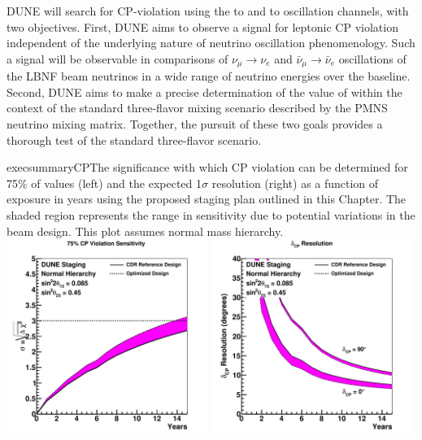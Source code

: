 DUNE will search for CP-violation using the \numu to \nue and
\anumu to \anue oscillation channels, with two objectives.  First, DUNE aims to observe a signal
for leptonic CP violation independent of the underlying nature of
neutrino oscillation phenomenology. Such a signal will be observable
in comparisons of $\nu_\mu \rightarrow \nu_e$ and $\bar{\nu}_{\mu}
\rightarrow \bar{\nu}_e$ oscillations of the LBNF beam neutrinos in a
wide range of neutrino energies over the  baseline.
Second,
DUNE aims to make a precise determination of the value of \deltacp
within the context of the standard three-flavor mixing scenario
described by the PMNS neutrino mixing matrix. Together, the pursuit of
these two goals provides a thorough test of the standard three-flavor
scenario.
%
\begin{cdrfigure}{execsummaryCP}{The
    significance with which CP violation can be determined for 75\% of
    \deltacp values (left) and the expected 1$\sigma$ resolution
    (right) as a function of exposure in years using the proposed
    staging plan outlined in this Chapter. The shaded region
    represents the range in sensitivity due to potential variations in
    the beam design. This plot assumes normal mass hierarchy.}
\includegraphics[width=0.49\textwidth]{volume-physics/figures/cpv75_exp_staging15yr}
 \includegraphics[width=0.49\textwidth]{volume-physics/figures/dcp_exp_staging.pdf}
\end{cdrfigure}
